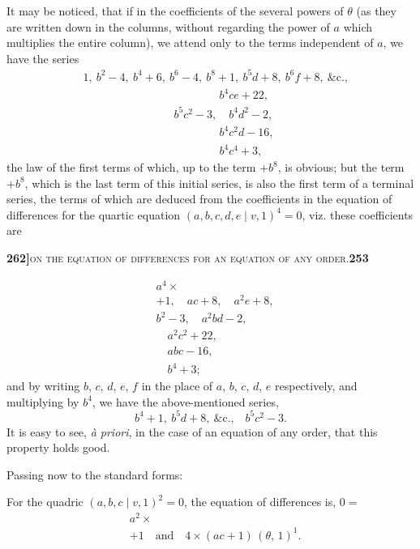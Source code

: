 \documentclass[11pt]{article}
\newcommand{\Cdel}{\mid}
\begin{document}
\medskip

\noindent It may be noticed, that if in the coefficients of the several powers of $\theta$ (as they are written down in the columns, without regarding the power of $a$ which multiplies the entire column), we attend only to the terms independent of $a$, we have the series
\[
\begin{aligned}
  &1,\ b^2 - 4,\ b^4 + 6,\ b^6 - 4,\ b^8 + 1,\ b^5 d + 8,\ b^6 f + 8,\ \&\text{c.,}\\
  &\hspace{12em} b^4 c e + 22,\\
  &\hspace{8em} b^5 c^2 - 3,\quad b^4 d^2 - 2,\\
  &\hspace{12em} b^4 c^2 d - 16,\\
  &\hspace{12em} b^4 c^4 + 3,
\end{aligned}
\]
the law of the first terms of which, up to the term $+ b^8$, is obvious; but the term $+ b^8$, which is the last term of this initial series, is also the first term of a terminal series, the terms of which are deduced from the coefficients in the equation of differences for the quartic equation $(a, b, c, d, e \Cdel v, 1)^4 = 0$, viz. these coefficients are

\newpage
\noindent\textbf{262]}\hfill\textsc{on the equation of differences for an equation of any order.}\hfill\textbf{253}

\medskip
\[
\begin{aligned}
  & a^4 \times\\
  & +1,\quad ac + 8,\quad a^2 e + 8,\\
  & b^2 - 3,\quad a^2 b d - 2,\\
  & \quad a^2 c^2 + 22,\\
  & \quad abc - 16,\\
  & \quad b^4 + 3;
\end{aligned}
\]
and by writing $b$, $c$, $d$, $e$, $f$ in the place of $a$, $b$, $c$, $d$, $e$ respectively, and multiplying by $b^4$, we have the above-mentioned series,
\[
  b^4 + 1,\ b^5 d + 8,\ \&\text{c.,}\quad b^5 c^2 - 3.
\]
It is easy to see, \textit{\`a priori}, in the case of an equation of any order, that this property holds good.

\medskip

\noindent Passing now to the standard forms:

\medskip

\noindent For the quadric $(a, b, c \Cdel v, 1)^2 = 0$, the equation of differences is, $0 = $
\[
\begin{aligned}
  & a^2 \times\\
  & +1\quad \text{and}\quad 4\times(ac + 1)\,(\theta,\,1)^1.
\end{aligned}
\]
\end{document}
